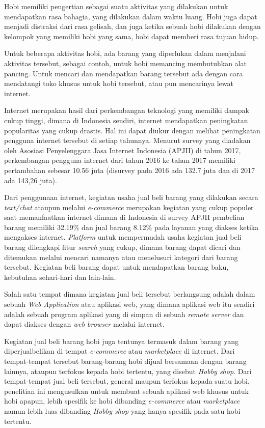 \documentclass[a4paper]{article}
\begin{document}
Hobi memiliki pengertian sebagai suatu aktivitas yang dilakukan untuk mendapatkan rasa bahagia, yang dilakukan dalam waktu luang. Hobi juga dapat menjadi distraksi dari rasa gelisah, dan juga ketika sebuah hobi dilakukan dengan kelompok yang memiliki hobi yang sama, hobi dapat memberi rasa tujuan hidup\autocite{zaidi2022passion}.


Untuk beberapa aktivitas hobi, ada barang yang diperlukan dalam menjalani aktivitas tersebut, sebagai contoh, untuk hobi memancing membutuhkan alat pancing. Untuk mencari dan mendapatkan barang tersebut ada dengan cara mendatangi toko khusus untuk hobi tersebut, atau pun mencarinya lewat internet.


Internet merupakan hasil dari perkembangan teknologi yang memiliki dampak cukup tinggi, dimana di Indonesia sendiri, internet mendapatkan peningkatan popularitas yang cukup drastis. Hal ini dapat diukur dengan melihat peningkatan pengguna internet tersebut di setiap tahunnya. Menurut survey yang diadakan oleh Asosiasi Penyelenggara Jasa Internet Indonesia (APJII) di tahun 2017, perkembangan pengguna internet dari tahun 2016 ke tahun 2017 memiliki pertambahan sebesar 10.56 juta (disurvey pada 2016 ada 132.7 juta dan di 2017 ada 143,26 juta)\autocite{indonesia2017infografis}.


Dari penggunaan internet, kegiatan usaha jual beli barang yang dilakukan secara \textit{text/chat} ataupun melalui \textit{e-commerce} merupakan kegiatan yang cukup populer saat memanfaatkan internet dimana di Indonesia di survey APJII pembelian barang memiliki 32.19\% dan jual barang 8.12\% pada layanan yang diakses ketika mengakses internet\autocite{indonesia2017infografis}. \textit{Platform} untuk mempermudah usaha kegiatan jual beli barang dilengkapi fitur \textit{search} yang cukup, dimana barang dapat dicari dan ditemukan melalui mencari namanya atau menelusuri kategori dari barang tersebut. Kegiatan beli barang dapat untuk mendapatkan barang baku, kebutuhan sehari-hari dan lain-lain.


Salah satu tempat dimana kegiatan jual beli tersebut berlangsung adalah dalam sebuah \textit{Web Application} atau aplikasi web, yang dimana aplikasi web itu sendiri adalah sebuah program aplikasi yang di simpan di sebuah \textit{remote server} dan dapat diakses dengan \textit{web browser} melalui internet\autocite{what-is-web-app}.


Kegiatan jual beli barang hobi juga tentunya termasuk dalam barang yang diperjualbelikan di tempat \textit{e-commerce} atau \textit{marketplace} di internet. Dari tempat-tempat tersebut barang-barang hobi dijual bersamaan dengan barang lainnya, ataupun terfokus kepada hobi tertentu, yang disebut \textit{Hobby shop}. Dari tempat-tempat jual beli tersebut, general maupun terfokus kepada suatu hobi, penelitian ini mengusulkan untuk membuat sebuah aplikasi web khusus untuk hobi apapun, lebih spesifik ke hobi dibanding \textit{e-commerce} atau \textit{marketplace} namun lebih luas dibanding \textit{Hobby shop} yang hanya spesifik pada satu hobi tertentu.
\end{document}
